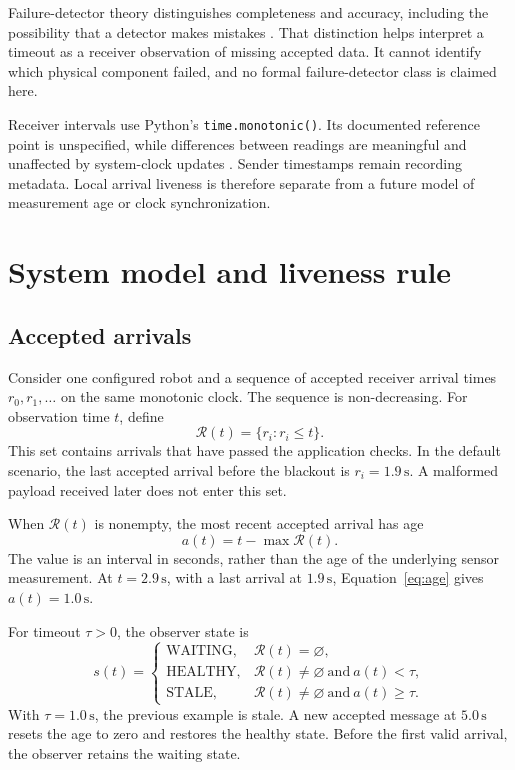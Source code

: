 \documentclass[11pt,a4paper]{article}
\newcommand{\code}[1]{\texttt{#1}}
\newcommand{\healthy}{\mathrm{HEALTHY}}
\newcommand{\stale}{\mathrm{STALE}}
\newcommand{\waiting}{\mathrm{WAITING}}
\begin{document}
Failure-detector theory distinguishes completeness and accuracy, including the
possibility that a detector makes mistakes \cite{chandra1996}. That distinction
helps interpret a timeout as a receiver observation of missing accepted data.
It cannot identify which physical component failed, and no formal
failure-detector class is claimed here.

Receiver intervals use Python's \code{time.monotonic()}. Its documented reference
point is unspecified, while differences between readings are meaningful and
unaffected by system-clock updates \cite{python_time}. Sender timestamps remain
recording metadata. Local arrival liveness is therefore separate from a future
model of measurement age or clock synchronization.

\section{System model and liveness rule}
\subsection{Accepted arrivals}
Consider one configured robot and a sequence of accepted receiver arrival times
$r_0,r_1,\ldots$ on the same monotonic clock. The sequence is non-decreasing.
For observation time $t$, define
\begin{equation}
\mathcal{R}(t)=\{r_i:r_i\leq t\}.
\label{eq:arrivals}
\end{equation}
This set contains arrivals that have passed the application checks. In the
default scenario, the last accepted arrival before the blackout is
$r_i=1.9\,\mathrm{s}$. A malformed payload received later does not enter this set.

When $\mathcal{R}(t)$ is nonempty, the most recent accepted arrival has age
\begin{equation}
a(t)=t-\max\mathcal{R}(t).
\label{eq:age}
\end{equation}
The value is an interval in seconds, rather than the age of the underlying
sensor measurement. At $t=2.9\,\mathrm{s}$, with a last arrival at
$1.9\,\mathrm{s}$, Equation~\eqref{eq:age} gives $a(t)=1.0\,\mathrm{s}$.

For timeout $\tau>0$, the observer state is
\begin{equation}
s(t)=
\begin{cases}
\waiting,&\mathcal{R}(t)=\varnothing,\\
\healthy,&\mathcal{R}(t)\neq\varnothing\ \text{and}\ a(t)<\tau,\\
\stale,&\mathcal{R}(t)\neq\varnothing\ \text{and}\ a(t)\geq\tau.
\end{cases}
\label{eq:state}
\end{equation}
With $\tau=1.0\,\mathrm{s}$, the previous example is stale. A new accepted message
at $5.0\,\mathrm{s}$ resets the age to zero and restores the healthy state.
Before the first valid arrival, the observer retains the waiting state.
\end{document}
